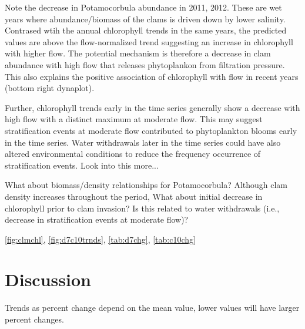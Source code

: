 \documentclass[letterpaper,12pt,oneside]{article}\usepackage[]{graphicx}\usepackage[]{color}
\begin{document}
Note the decrease in Potamocorbula abundance in 2011, 2012.  These are wet years where abundance/biomass of the clams is driven down by lower salinity.  Contrased wtih the annual chlorophyll trends in the same years, the predicted values are above the flow-normalized trend suggesting an increase in chlorophyll with higher flow.  The potential mechanism is therefore a decrease in clam abundance with high flow that releases phytoplankon from filtration pressure.  This also explains the positive association of chlorophyll with flow in recent years (bottom right dynaplot). 

Further, chlorophyll trends early in the time series generally show a decrease with high flow with a distinct maximum at moderate flow.  This may suggest stratification events at moderate flow contributed to phytoplankton blooms early in the time series. Water withdrawals later in the time series could have also altered environmental conditions to reduce the frequency occurrence of stratification events.  Look into this more...

What about biomass/density relationships for Potamocorbula?  Although clam density increases throughout the period,  What about initial decrease in chlorophyll prior to clam invasion?  Is this related to water withdrawals (i.e., decrease in stratification events at moderate flow)?

\cref{fig:clmchl}, \cref{fig:d7c10trnds}, \cref{tab:d7chg}, \cref{tab:c10chg}

\section{Discussion}

Trends as percent change depend on the mean value, lower values will have larger percent changes.
\end{document}
